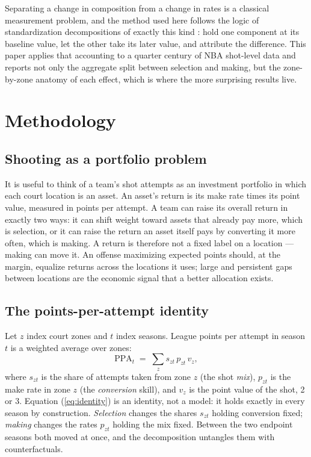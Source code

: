 \documentclass[12pt]{article}
\def\ppa{\mathrm{PPA}}
\begin{document}
Separating a change in composition from a change in rates is a classical
measurement problem, and the method used here follows the logic of
standardization decompositions of exactly this kind \citep{kitagawa1955}:
hold one component at its baseline value, let the other take its later value,
and attribute the difference. This paper applies that accounting to a
quarter century of NBA shot-level data and reports not only the aggregate
split between selection and making, but the zone-by-zone anatomy of each
effect, which is where the more surprising results live.

\section{Methodology}

\subsection{Shooting as a portfolio problem}

It is useful to think of a team's shot attempts as an investment portfolio in
which each court location is an asset. An asset's return is its make rate
times its point value, measured in points per attempt. A team can raise its
overall return in exactly two ways: it can shift weight toward assets that
already pay more, which is selection, or it can raise the return an asset
itself pays by converting it more often, which is making. A return is
therefore not a fixed label on a location --- making can move it. An offense
maximizing expected points should, at the margin, equalize returns across the
locations it uses; large and persistent gaps between locations are the
economic signal that a better allocation exists.

\subsection{The points-per-attempt identity}

Let $z$ index court zones and $t$ index seasons. League points per attempt in
season $t$ is a weighted average over zones:
\begin{equation}
\ppa_t \;=\; \sum_{z} s_{zt}\, p_{zt}\, v_{z},
\label{eq:identity}
\end{equation}
where $s_{zt}$ is the share of attempts taken from zone $z$ (the shot
\emph{mix}), $p_{zt}$ is the make rate in zone $z$ (the \emph{conversion}
skill), and $v_z$ is the point value of the shot, 2 or 3. Equation
(\ref{eq:identity}) is an identity, not a model: it holds exactly in every
season by construction. \emph{Selection} changes the shares $s_{zt}$ holding
conversion fixed; \emph{making} changes the rates $p_{zt}$ holding the mix
fixed. Between the two endpoint seasons both moved at once, and the
decomposition untangles them with counterfactuals.
\end{document}
